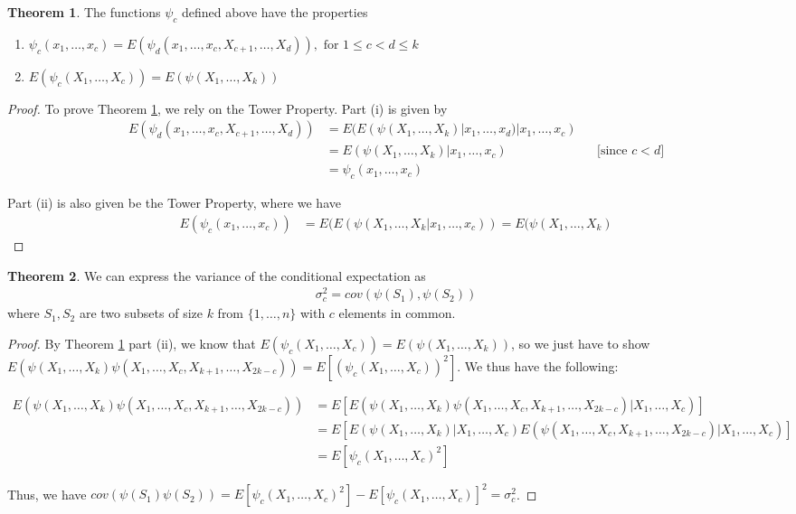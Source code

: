 \documentclass{article}
\theoremstyle{definition}
\newtheorem{theorem}{Theorem}
\numberwithin{Def}{section}
\begin{document}
\begin{theorem}\label{cond_exp}
The functions $\psi_c$ defined above have the properties
        \begin{enumerate}[label = (\roman*)]
            \item $\psi_c(x_1, \dotsc, x_c) = E(\psi_d(x_1, \dotsc, x_c, X_{c+1}, \dotsc, X_d)), \text{ for } 1 \leq c <d \leq k$
            \item $E(\psi_c(X_1, \dotsc, X_c)) = E(\psi(X_1, \dotsc, X_k))$
        \end{enumerate}
\end{theorem}
\begin{proof}
To prove Theorem \ref{cond_exp}, we rely on the Tower Property. Part (i) is given by 
\begin{align*}
 E(\psi_d(x_1, \dotsc, x_c, X_{c+1}, \dotsc, X_d)) &= E(E(\psi(X_1, \dotsc, X_k)|x_1, \dotsc, x_d)|x_1, \dotsc, x_c)  \\
 &= E(\psi(X_1, \dotsc, X_k)|x_1, \dotsc, x_c)  &&\text{[since $c<d$]}\\
 &=\psi_c(x_1, \dotsc, x_c)
\end{align*}

Part (ii) is also given be the Tower Property, where we have 
\begin{align*}
    E(\psi_c(x_1, \dotsc, x_c)) &= E(E(\psi(X_1, \dotsc, X_k|x_1, \dotsc, x_c)) = E(\psi(X_1, \dotsc, X_k)
\end{align*}
\end{proof}

\begin{theorem}\label{cond_exp_prop}
We can express the variance of the conditional expectation as \begin{align}
    \sigma_c^2 = cov(\psi(S_1), \psi(S_2))
\end{align}
where $S_1, S_2$ are two subsets of size $k$ from $\{1, \dotsc, n\}$ with $c$ elements in common. 
\end{theorem}

\begin{proof}
By Theorem \ref{cond_exp} part (ii), we know that $E(\psi_c(X_1, \dotsc, X_c)) = E(\psi(X_1, \dotsc, X_k))$, so we just have to show $E(\psi(X_1, \dotsc, X_k)\psi(X_1, \dotsc, X_c, X_{k+1}, \dotsc, X_{2k-c})) = E\left[(\psi_c(X_1, \dotsc, X_c))^2\right]$. We thus have the following:
\begin{fontsize}{8}{12}
\begin{align*}
    E(\psi(X_1, \dotsc, X_k)\psi(X_1, \dotsc, X_c, X_{k+1}, \dotsc, X_{2k-c}))&= E\left[E(\psi(X_1, \dotsc, X_k)\psi(X_1, \dotsc, X_c, X_{k+1}, \dotsc, X_{2k-c})|X_1, \dotsc, X_c)\right]\\
    &=E\left[E(\psi(X_1, \dotsc, X_k)|X_1, \dotsc, X_c) E(\psi(X_1, \dotsc, X_c, X_{k+1}, \dotsc, X_{2k-c})|X_1, \dotsc, X_c)\right]\\
    &=E\left[\psi_c(X_1, \dotsc, X_c)^2\right]
\end{align*}
\end{fontsize}Thus, we have $cov(\psi(S_1)\psi(S_2)) = E\left[\psi_c(X_1, \dotsc, X_c)^2\right] - E\left[\psi_c(X_1, \dotsc, X_c)\right]^2 = \sigma_c^2$.
\end{proof}
\end{document}
